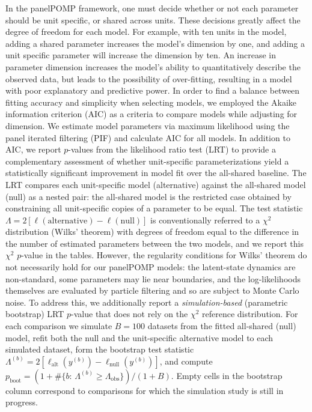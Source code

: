 \documentclass[aoas,preprint]{imsart}\usepackage[]{graphicx}\usepackage[]{xcolor}
\begin{document}
In the panelPOMP framework, one must decide whether or not each parameter should be unit specific, or shared across units.
These decisions greatly affect the degree of freedom for each model. For example, with ten units in the model, adding a shared parameter increases the model’s dimension by one, and adding a unit specific parameter will increase the dimension by ten.
An increase in parameter dimension increases the model’s ability to quantitatively describe the observed data, but leads to the possibility of over-fitting, resulting in a model with poor explanatory and predictive power.
In order to find a balance between fitting accuracy and simplicity when selecting models, we employed the Akaike information criterion (AIC) as a criteria to compare models while adjusting for dimension.
We estimate model parameters via maximum likelihood using the panel iterated filtering (PIF) \citep{breto20} and calculate AIC for all models.
In addition to AIC, we report $p$-values from the likelihood ratio test (LRT) to provide a complementary assessment of whether unit-specific parameterizations yield a statistically significant improvement in model fit over the all-shared baseline.
The LRT compares each unit-specific model (alternative) against the all-shared model (null) as a nested pair: the all-shared model is the restricted case obtained by constraining all unit-specific copies of a parameter to be equal.
The test statistic $\Lambda = 2[\ell(\text{alternative}) - \ell(\text{null})]$ is conventionally referred to a $\chi^2$ distribution (Wilks' theorem) with degrees of freedom equal to the difference in the number of estimated parameters between the two models, and we report this $\chi^2$ $p$-value in the tables.
However, the regularity conditions for Wilks' theorem do not necessarily hold for our panelPOMP models: the latent-state dynamics are non-standard, some parameters may lie near boundaries, and the log-likelihoods themselves are evaluated by particle filtering and so are subject to Monte Carlo noise.
To address this, we additionally report a \emph{simulation-based} (parametric bootstrap) LRT $p$-value that does not rely on the $\chi^2$ reference distribution.
For each comparison we simulate $B=100$ datasets from the fitted all-shared (null) model, refit both the null and the unit-specific alternative model to each simulated dataset, form the bootstrap test statistic $\Lambda^{(b)} = 2[\ell_{\text{alt}}(y^{(b)}) - \ell_{\text{null}}(y^{(b)})]$, and compute $p_{\text{boot}} = (1 + \#\{b:\,\Lambda^{(b)} \ge \Lambda_{\text{obs}}\}) / (1 + B)$.
Empty cells in the bootstrap column correspond to comparisons for which the simulation study is still in progress.
\end{document}
